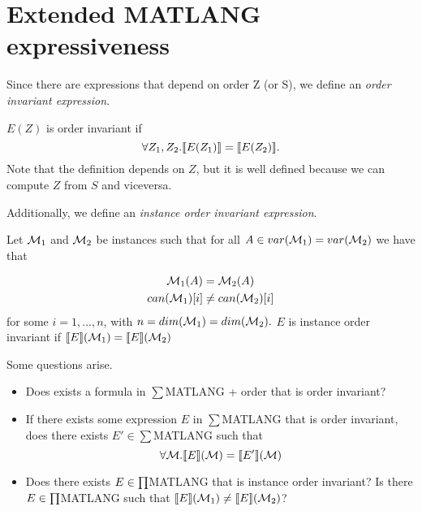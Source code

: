 \section{Extended MATLANG expressiveness}

Since there are expressions that depend on order Z (or S), we define an \textit{order invariant expression}.

$E(Z)$ is order invariant if $$\forall Z_1, Z_2. \llbracket E(Z_1) \rrbracket=\llbracket E(Z_2) \rrbracket.$$
Note that the definition depends on $Z$, but it is well defined because we can compute $Z$ from $S$ and viceversa.

Additionally, we define an \textit{instance order invariant expression}.

Let $\mathcal{M}_1$ and $\mathcal{M}_2$ be instances such that for all $A\in var(\mathcal{M}_1)=var(\mathcal{M}_2)$ we have that

\begin{align*}
	\mathcal{M}_1(A)&=\mathcal{M}_2(A) \\
	can(\mathcal{M}_1)[i]&\neq can(\mathcal{M}_2)[i]
\end{align*}
for some $i=1, \ldots, n$, with $n=dim(\mathcal{M}_1)=dim(\mathcal{M}_2).$ $E$ is instance order invariant if $\llbracket E \rrbracket(\mathcal{M}_1)=\llbracket E \rrbracket(\mathcal{M}_2)$

Some questions arise.

\begin{itemize}
	\item Does exists a formula in $\sum$MATLANG + order that is order invariant?
	\item If there exists some expression $E$ in $\sum$MATLANG that is order invariant, does there exists $E'\in\sum$MATLANG such that $$\forall\mathcal{M}.\llbracket E \rrbracket(\mathcal{M})=\llbracket E' \rrbracket(\mathcal{M})$$
	\item Does there exists $E\in\textstyle\prod$MATLANG that is instance order invariant? Is there $E\in\textstyle\prod$MATLANG such that $\llbracket E \rrbracket(\mathcal{M}_1)\neq\llbracket E \rrbracket(\mathcal{M}_2)$?
	
\end{itemize}

\label{expressiveness}